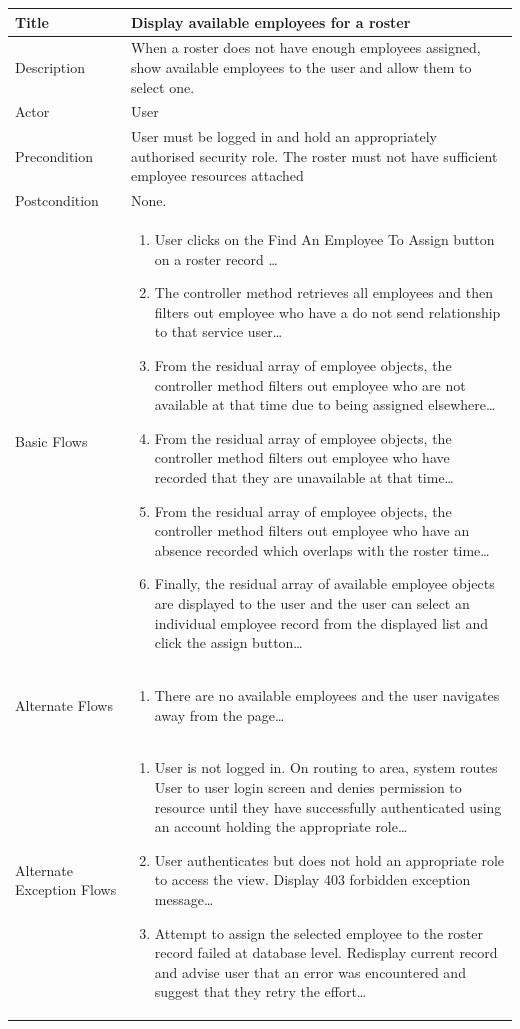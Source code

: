 \documentclass[a4paper,Times New Roman 11pt]{article}
\newcommand\addrow[2]{#1 &#2\\ }
\newcommand\addheading[2]{#1 &#2\\ \hline}
\newcommand\tabularhead{\begin{tabular}{lp{9cm}}
\hline
}
\newcommand\addmulrow[2]{ \begin{minipage}[t][][t]{3cm}#1\end{minipage}%
   &\begin{minipage}[t][][t]{9cm}
    \begin{enumerate} #2   \end{enumerate}
    \end{minipage}\\ }
\newenvironment{usecase}{\tabularhead}
{\hline\end{tabular}}
\begin{document}
\begin{samepage}
\begin{usecase}
    \addheading{Title}{Display available employees for a roster}
  \addheading{Description}{When a roster does not have enough employees assigned, show available employees to the user and allow them to select one.}
  \addheading{Actor}{User} 
  \addrow{Precondition}{User must be logged in and hold an appropriately authorised security role. The roster must not have sufficient employee resources attached}
  \addrow{Postcondition}{None.}
  \addmulrow{Basic Flows}{\item User clicks on the Find An Employee To Assign button on a roster record \ldots
  \newpage
  \item The controller method retrieves all employees and then filters out employee who have a do not send relationship to that service user\ldots
  \item From the residual array of employee objects, the controller method filters out employee who are not available at that time due to being assigned elsewhere\ldots
    \item From the residual array of employee objects, the controller method filters out employee who have recorded that they are unavailable at that time\ldots
        \item From the residual array of employee objects, the controller method filters out employee who have an absence recorded which overlaps with the roster time\ldots
            \item Finally, the residual array of available employee objects are displayed to the user and the user can select an individual employee record from the displayed list and click the assign button\ldots}
  \addmulrow{Alternate  Flows}{\item There are no available employees and the user navigates away from the page\ldots}
  \addmulrow{Alternate Exception Flows}{\item User is not logged in. On routing to area, system routes User to user login screen and denies permission to resource until they have successfully authenticated using an account holding the appropriate role\ldots
                                                                      \item User authenticates but does not hold an appropriate role to access the  view. Display 403 forbidden exception message\ldots
                                                                      \item Attempt to assign the selected employee to the roster record failed at database level. Redisplay current record and advise user that an error was encountered and suggest that they retry the effort\ldots}
\end{usecase}


\end{samepage}
\end{document}
